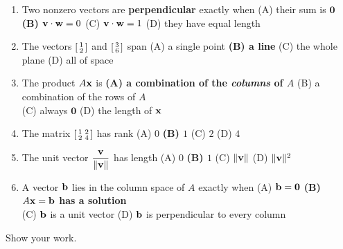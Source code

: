 \begin{enumerate}[leftmargin=1.9em, itemsep=9pt]
  \item Two nonzero vectors are \textbf{perpendicular} exactly when
    \hfill (A) their sum is $\mathbf 0$ \quad \textbf{(B) $\mathbf{v}\cdot\mathbf{w}=0$} \ans{$\leftarrow$} \quad
    (C) $\mathbf{v}\cdot\mathbf{w}=1$ \quad (D) they have equal length
  \item The vectors $\begin{bsmallmatrix}1\\2\end{bsmallmatrix}$ and
    $\begin{bsmallmatrix}3\\6\end{bsmallmatrix}$ span
    \hfill (A) a single point \quad \textbf{(B) a line} \ans{$\leftarrow$} \quad (C) the whole plane \quad (D) all of space
  \item The product $A\mathbf{x}$ is
    \hfill \textbf{(A) a combination of the \emph{columns} of $A$} \ans{$\leftarrow$} \quad (B) a combination of the rows of $A$ \\
    \phantom{x}\hfill (C) always $\mathbf 0$ \quad (D) the length of $\mathbf{x}$
  \item The matrix $\begin{bsmallmatrix}1&2\\2&4\end{bsmallmatrix}$ has rank
    \hfill (A) $0$ \quad \textbf{(B) $1$} \ans{$\leftarrow$} \quad (C) $2$ \quad (D) $4$
  \item The unit vector $\dfrac{\mathbf{v}}{\|\mathbf{v}\|}$ has length
    \hfill (A) $0$ \quad \textbf{(B) $1$} \ans{$\leftarrow$} \quad (C) $\|\mathbf{v}\|$ \quad (D) $\|\mathbf{v}\|^2$
  \item A vector $\mathbf{b}$ lies in the column space of $A$ exactly when
    \hfill (A) $\mathbf{b}=\mathbf 0$ \quad \textbf{(B) $A\mathbf{x}=\mathbf{b}$ has a solution} \ans{$\leftarrow$} \\
    \phantom{x}\hfill (C) $\mathbf{b}$ is a unit vector \quad (D) $\mathbf{b}$ is perpendicular to every column
\end{enumerate}

Show your work.

